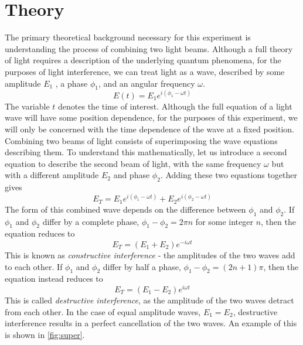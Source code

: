   \section{Theory}
  The primary theoretical background necessary for this experiment is understanding the process of combining two light beams. Although a full theory of light requires a description of the underlying quantum phenomena, for the purposes of light interference, we can treat light as a wave, described by some amplitude $E_1$ , a phase $\phi_1$, and an angular frequency $\omega$.
  \begin{equation}
    E(t) = E_1 e^{i(\phi_1 - \omega t)}
  \end{equation}
  The variable $t$ denotes the time of interest. Although the full equation of a light wave will have some position dependence, for the purposes of this experiment, we will only be concerned with the time dependence of the wave at a fixed position. Combining two beams of light consists of superimposing the wave equations describing them. To understand this mathematically, let us introduce a second equation to describe the second beam of light, with the same frequency $\omega$ but with a different amplitude $E_2$ and phase $\phi_2$.
  Adding these two equations together gives
  \begin{equation}
    E_T =  E_1 e^{i(\phi_1 - \omega t)}+  E_2 e^{i(\phi_2 - \omega t)}
  \end{equation}
  The form of this combined wave depends on the difference between $\phi_1$ and $\phi_2$. If $\phi_1$ and $\phi_2$ differ by a complete phase, $\phi_1 - \phi_2 = 2\pi n $ for some integer $n$, then the equation reduces to
  \begin{equation}
    E_T = (E_1 + E_2) e^{-i\omega t}
  \end{equation}
  This is known as \textit{constructive interference} - the amplitudes of the two waves add to each other. If $\phi_1$ and $\phi_2$ differ by half a phase, $\phi_1 - \phi_2 = (2n + 1)\pi$, then the equation instead reduces to
  \begin{equation}
    E_T = (E_1 - E_2) e^{i \omega t}
  \end{equation}
  This is called \textit{destructive interference}, as the amplitude of the two waves detract from each other. In the case of equal amplitude waves, $E_1 = E_2$, destructive interference results in a perfect cancellation of the two waves. An example of this is shown in \ref{fig:super}.
